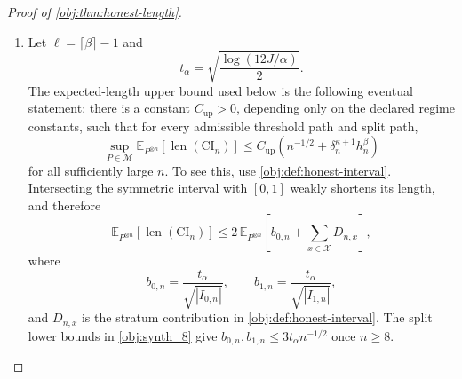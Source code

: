 \documentclass[11pt]{article}
\begin{document}
\begin{proof}[Proof of \cref{obj:thm:honest-length}]
\begin{enumerate}
\item Let \(\ell=\lceil\beta\rceil-1\) and
\[
t_\alpha=\sqrt{\frac{\log(12J/\alpha)}{2}} .
\]
The expected-length upper bound used below is the following eventual statement: there is a constant
\(C_{\mathrm{up}}>0\), depending only on the declared regime constants, such that for every admissible
threshold path and split path,
\[
\sup_{P\in\mathcal M}
\mathbb E_{P^{\otimes n}}
\!\left[\operatorname{len}(\mathrm{CI}_n)\right]
\le
C_{\mathrm{up}}
\left(n^{-1/2}+\delta_n^{\kappa+1}h_n^\beta\right)
\]
for all sufficiently large \(n\). To see this, use \cref{obj:def:honest-interval}. Intersecting the
symmetric interval with \([0,1]\) weakly shortens its length, and therefore
\[
\mathbb E_{P^{\otimes n}}\!\left[\operatorname{len}(\mathrm{CI}_n)\right]
\le
2\,\mathbb E_{P^{\otimes n}}\!\left[
 b_{0,n}+\sum_{x\in\mathcal X}D_{n,x}\right],
\]
where
\[
b_{0,n}=\frac{t_\alpha}{\sqrt{|I_{0,n}|}},
\qquad
b_{1,n}=\frac{t_\alpha}{\sqrt{|I_{1,n}|}},
\]
and \(D_{n,x}\) is the stratum contribution in \cref{obj:def:honest-interval}. The split lower bounds
in \cref{obj:synth_8} give \(b_{0,n},b_{1,n}\le 3t_\alpha n^{-1/2}\) once \(n\ge8\).


\end{enumerate}
\end{proof}
\end{document}
